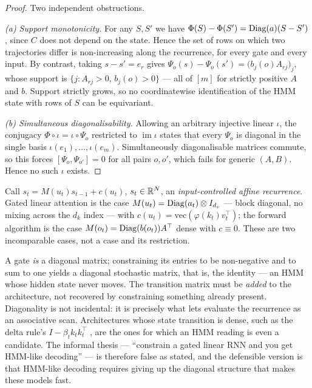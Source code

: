 \begin{proof}
Two independent obstructions.

\emph{(a) Support monotonicity.} For any $S,S'$ we have
$\Phi(S) - \Phi(S') = \mathrm{Diag}(a)(S-S')$, since $C$ does not depend on the state.
Hence the set of rows on which two trajectories differ is non-increasing along
the recurrence, for every gate and every input. By contrast, taking
$s - s' = e_r$ gives $\Psi_o(s) - \Psi_o(s') = \big(b_j(o)A_{rj}\big)_j$, whose
support is $\{j : A_{rj} > 0,\, b_j(o) > 0\}$ --- all of $[m]$ for strictly
positive $A$ and $b$. Support strictly grows, so no coordinatewise
identification of the HMM state with rows of $S$ can be equivariant.

\emph{(b) Simultaneous diagonalisability.} Allowing an arbitrary injective
linear $\iota$, the conjugacy $\Phi\circ\iota = \iota\circ\Psi_o$ restricted to
$\operatorname{im}\iota$ states that every $\Psi_o$ is diagonal in the single
basis $\iota(e_1),\dots,\iota(e_m)$. Simultaneously diagonalisable matrices
commute, so this forces $[\Psi_o, \Psi_{o'}] = 0$ for all pairs $o,o'$, which
fails for generic $(A,B)$. Hence no such $\iota$ exists.
\end{proof}

\begin{proposition}
\label{prop:affine}
Call $s_t = M(u_t)s_{t-1} + c(u_t)$, $s_t \in \mathbb{R}^{N}$, an \emph{input-controlled
affine recurrence}. Gated linear attention is the case
$M(u_t) = \mathrm{Diag}(a_t)\otimes I_{d_v}$ --- block diagonal, no mixing across the
$d_k$ index --- with $c(u_t) = \mathrm{vec}(\varphi(k_t)v_t^\top)$; the forward
algorithm is the case $M(o_t) = \mathrm{Diag}(b(o_t))A^\top$ dense with $c \equiv 0$.
These are two incomparable cases, not a case and its restriction.
\end{proposition}

\begin{remark}
\label{rem:thesis3}
A gate \emph{is} a diagonal matrix; constraining its entries to be non-negative
and to sum to one yields a diagonal stochastic matrix, that is, the identity ---
an HMM whose hidden state never moves. The transition matrix must be
\emph{added} to the architecture, not recovered by constraining something already
present. Diagonality is not incidental: it is precisely what lets
\cite{yang2024gla,dao2024mamba2} evaluate the recurrence as an associative scan.
Architectures whose state transition is dense, such as the delta rule's
$I - \beta_t k_tk_t^\top$ \cite{yang2024delta}, are the ones for which an HMM
reading is even a candidate. The informal thesis --- ``constrain a gated linear
RNN and you get HMM-like decoding'' --- is therefore false as stated, and the
defensible version is that HMM-like decoding requires giving up the diagonal
structure that makes these models fast.
\end{remark}

